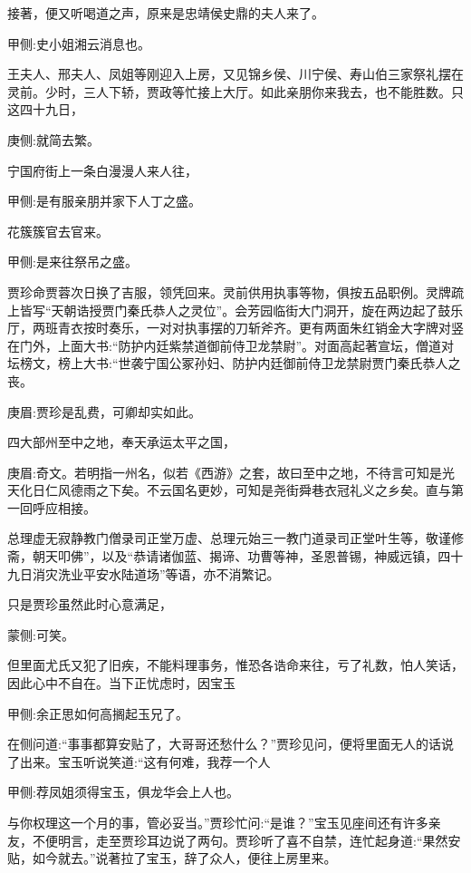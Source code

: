\begin{parag}
    接著，便又听喝道之声，原来是忠靖侯史鼎的夫人来了。\begin{note}甲侧:史小姐湘云消息也。\end{note}王夫人、邢夫人、凤姐等刚迎入上房，又见锦乡侯、川宁侯、寿山伯三家祭礼摆在灵前。少时，三人下轿，贾政等忙接上大厅。如此亲朋你来我去，也不能胜数。只这四十九日，\begin{note}庚侧:就简去繁。\end{note}宁国府街上一条白漫漫人来人往，\begin{note}甲侧:是有服亲朋并家下人丁之盛。\end{note}花簇簇官去官来。\begin{note}甲侧:是来往祭吊之盛。\end{note}
\end{parag}


\begin{parag}
    贾珍命贾蓉次日换了吉服，领凭回来。灵前供用执事等物，俱按五品职例。灵牌疏上皆写“天朝诰授贾门秦氏恭人之灵位”。会芳园临街大门洞开，旋在两边起了鼓乐厅，两班青衣按时奏乐，一对对执事摆的刀斩斧齐。更有两面朱红销金大字牌对竖在门外，上面大书:“防护内廷紫禁道御前侍卫龙禁尉”。对面高起著宣坛，僧道对坛榜文，榜上大书:“世袭宁国公冢孙妇、防护内廷御前侍卫龙禁尉贾门秦氏恭人之丧。\begin{note}庚眉:贾珍是乱费，可卿却实如此。\end{note}四大部州至中之地，奉天承运太平之国，\begin{note}庚眉:奇文。若明指一州名，似若《西游》之套，故曰至中之地，不待言可知是光天化日仁风德雨之下矣。不云国名更妙，可知是尧街舜巷衣冠礼义之乡矣。直与第一回呼应相接。\end{note}总理虚无寂静教门僧录司正堂万虚、总理元始三一教门道录司正堂叶生等，敬谨修斋，朝天叩佛”，以及“恭请诸伽蓝、揭谛、功曹等神，圣恩普锡，神威远镇，四十九日消灾洗业平安水陆道场”等语，亦不消繁记。
\end{parag}


\begin{parag}
    只是贾珍虽然此时心意满足，\begin{note}蒙侧:可笑。\end{note}但里面尤氏又犯了旧疾，不能料理事务，惟恐各诰命来往，亏了礼数，怕人笑话，因此心中不自在。当下正忧虑时，因宝玉\begin{note}甲侧:余正思如何高搁起玉兄了。\end{note}在侧问道:“事事都算安贴了，大哥哥还愁什么？”贾珍见问，便将里面无人的话说了出来。宝玉听说笑道:“这有何难，我荐一个人\begin{note}甲侧:荐凤姐须得宝玉，俱龙华会上人也。\end{note}与你权理这一个月的事，管必妥当。”贾珍忙问:“是谁？”宝玉见座间还有许多亲友，不便明言，走至贾珍耳边说了两句。贾珍听了喜不自禁，连忙起身道:“果然安贴，如今就去。”说著拉了宝玉，辞了众人，便往上房里来。
\end{parag}


